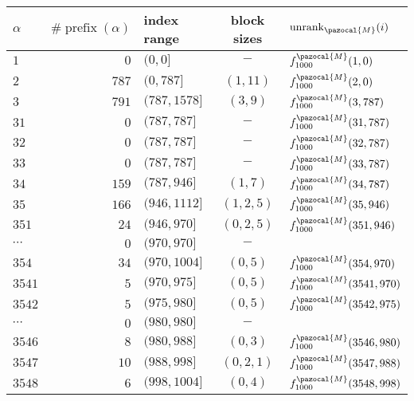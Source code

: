 \begin{table}
  \center
  \begin{tabular}{|l|r|l|c|l|}
    \hline
    $\alpha$ & $\#\operatorname{prefix}(\alpha)$ & index range & block sizes & $\operatorname{unrank}_\pazocal{M}(i)$\\ \hline
    $1       $ & $0$   & $(0,0]$            & $-$       & $f_{1000}^\pazocal{M}(1,0)$          \\
    $2       $ & $787$ & $(0,787]$          & $(1,11)$  & $f_{1000}^\pazocal{M}(2,0)$          \\
    $3       $ & $791$ & $(787, 1578]$      & $(3,9)$   & $f_{1000}^\pazocal{M}(3,787)$        \\ \hline
    $31      $ & $0$   & $(787, 787]$       & $-$       & $f_{1000}^\pazocal{M}(31,787)$       \\
    $32      $ & $0$   & $(787, 787]$       & $-$       & $f_{1000}^\pazocal{M}(32,787)$       \\
    $33      $ & $0$   & $(787, 787]$       & $-$       & $f_{1000}^\pazocal{M}(33,787)$       \\
    $34      $ & $159$ & $(787, 946]$       & $(1,7)$   & $f_{1000}^\pazocal{M}(34,787)$       \\
    $35      $ & $166$ & $(946, 1112]$      & $(1,2,5)$ & $f_{1000}^\pazocal{M}(35,946)$       \\ \hline
    $351     $ & $24$  & $(946, 970]$       & $(0,2,5)$ & $f_{1000}^\pazocal{M}(351,946)$      \\
    $\cdots$   & $0$   & $(970,970]$        & $-$       & \\
    $354     $ & $34$  & $(970, 1004]$      & $(0,5)$   & $f_{1000}^\pazocal{M}(354,970)$      \\ \hline
    $3541    $ & $5$   & $(970,975]$        & $(0,5)$   & $f_{1000}^\pazocal{M}(3541,970)$     \\
    $3542    $ & $5$   & $(975,980]$        & $(0,5)$   & $f_{1000}^\pazocal{M}(3542,975)$     \\
    $\cdots$   & $0$   & $(980,980]$        & $-$       & \\
    $3546    $ & $8$   & $(980,988]$        & $(0,3)$   & $f_{1000}^\pazocal{M}(3546,980)$     \\
    $3547    $ & $10$  & $(988,998]$        & $(0,2,1)$ & $f_{1000}^\pazocal{M}(3547,988)$     \\
    $3548    $ & $6$   & $(998,1004]$       & $(0,4)$   & $f_{1000}^\pazocal{M}(3548,998)$     \\ \hline

\end{tabular}
\end{table}
